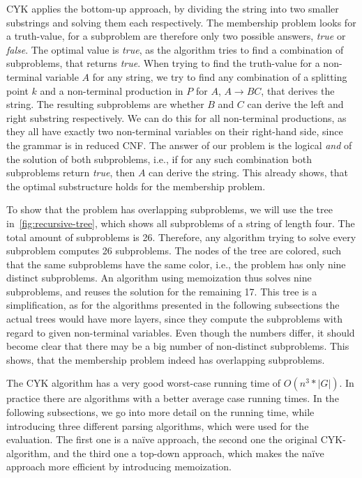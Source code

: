 CYK applies the bottom-up approach, by dividing the string into two smaller substrings and solving them each respectively.
The membership problem looks for a truth-value, for a subproblem are therefore only two possible answers, \textit{true} or \textit{false}.
The optimal value is \textit{true}, as the algorithm tries to find a combination of subproblems, that returns \textit{true}.
When trying to find the truth-value for a non-terminal variable $A$ for any string, we try to find any combination of a splitting point $k$ and a non-terminal production in $P$ for $A$, $A\rightarrow BC$, that derives the string.
The resulting subproblems are whether $B$ and $C$ can derive the left and right substring respectively.
We can do this for all non-terminal productions, as they all have exactly two non-terminal variables on their right-hand side, since the grammar is in reduced CNF.
The answer of our problem is the logical \textit{and} of the solution of both subproblems, i.e., if for any such combination both subproblems return \textit{true}, then $A$ can derive the string.
This already shows, that the optimal substructure holds for the membership problem.



To show that the problem has overlapping subproblems, we will use the tree in~\cref{fig:recursive-tree}, which shows all subproblems of a string of length four.
The total amount of subproblems is 26.
Therefore, any algorithm trying to solve every subproblem computes 26 subproblems.
The nodes of the tree are colored, such that the same subproblems have the same color, i.e., the problem has only nine distinct subproblems.
An algorithm using memoization thus solves nine subproblems, and reuses the solution for the remaining 17.
This tree is a simplification, as for the algorithms presented in the following subsections the actual trees would have more layers, since they compute the subproblems with regard to given non-terminal variables.
Even though the numbers differ, it should become clear that there may be a big number of non-distinct subproblems.
This shows, that the membership problem indeed has overlapping subproblems.

The CYK algorithm has a very good worst-case running time of $O(n^3 * |G|)$.
In practice there are algorithms with a better average case running times.
In the following subsections, we go into more detail on the running time, while introducing three different parsing algorithms, which were used for the evaluation.
The first one is a na\"{i}ve approach, the second one the original CYK-algorithm, and the third one a top-down approach, which makes the na\"{i}ve approach more efficient by introducing memoization.

